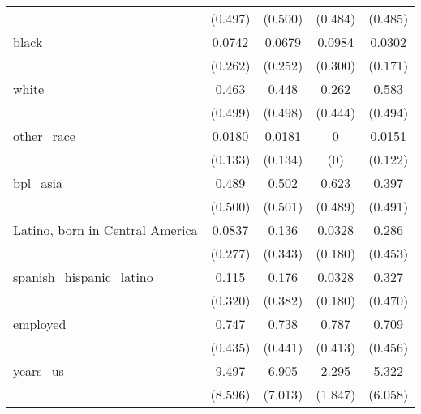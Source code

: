 \begin{table}[htbp]
\begin{tabular}{l*{4}{c}}
                    &     (0.497)         &     (0.500)         &     (0.484)         &     (0.485)         \\
[1em]
black               &      0.0742         &      0.0679         &      0.0984         &      0.0302         \\
                    &     (0.262)         &     (0.252)         &     (0.300)         &     (0.171)         \\
[1em]
white               &       0.463         &       0.448         &       0.262         &       0.583         \\
                    &     (0.499)         &     (0.498)         &     (0.444)         &     (0.494)         \\
[1em]
other\_race          &      0.0180         &      0.0181         &           0         &      0.0151         \\
                    &     (0.133)         &     (0.134)         &         (0)         &     (0.122)         \\
[1em]
bpl\_asia            &       0.489         &       0.502         &       0.623         &       0.397         \\
                    &     (0.500)         &     (0.501)         &     (0.489)         &     (0.491)         \\
[1em]
Latino, born in Central America&      0.0837         &       0.136         &      0.0328         &       0.286         \\
                    &     (0.277)         &     (0.343)         &     (0.180)         &     (0.453)         \\
[1em]
spanish\_hispanic\_latino&       0.115         &       0.176         &      0.0328         &       0.327         \\
                    &     (0.320)         &     (0.382)         &     (0.180)         &     (0.470)         \\
[1em]
employed            &       0.747         &       0.738         &       0.787         &       0.709         \\
                    &     (0.435)         &     (0.441)         &     (0.413)         &     (0.456)         \\
[1em]
years\_us            &       9.497         &       6.905         &       2.295         &       5.322         \\
                    &     (8.596)         &     (7.013)         &     (1.847)         &     (6.058)         \\

\end{tabular}
\end{table}

